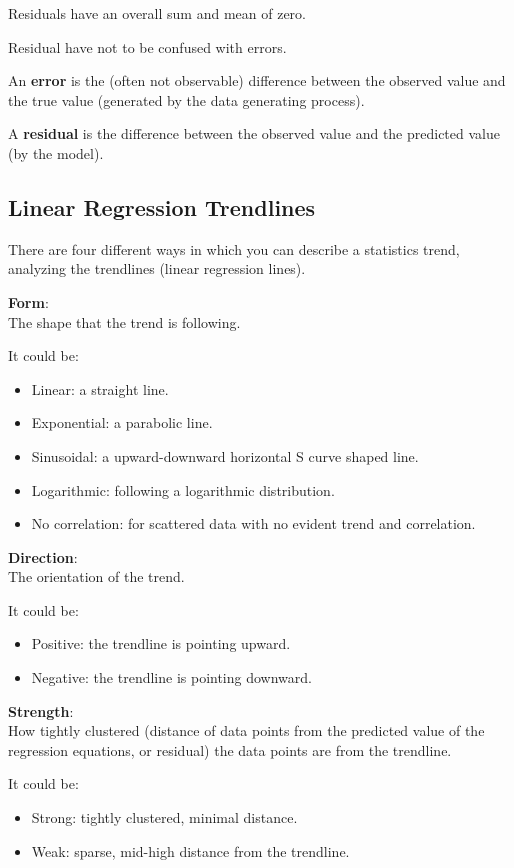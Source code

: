 \documentclass{article}
\begin{document}
Residuals have an overall sum and mean of zero.

Residual have not to be confused with errors.

An \textbf{error} is the (often not observable) difference between the observed value and the true value (generated by the data generating process).

A \textbf{residual} is the difference between the observed value and the predicted value (by the model). 

\subsection{Linear Regression Trendlines}
There are four different ways in which you can describe a statistics trend, analyzing the trendlines (linear regression lines).

\textbf{Form}: \\
The shape that the trend is following. 

It could be: 
\begin{itemize}
    \item Linear: a straight line.
    \item Exponential: a parabolic line.
    \item Sinusoidal: a upward-downward horizontal S curve shaped line.
    \item Logarithmic: following a logarithmic distribution.
    \item No correlation: for scattered data with no evident trend and correlation.
\end{itemize}
 
\textbf{Direction}: \\
The orientation of the trend.

It could be:
\begin{itemize}
    \item Positive: the trendline is pointing upward.
    \item Negative: the trendline is pointing downward.
\end{itemize}

\textbf{Strength}: \\ 
How tightly clustered (distance of data points from the predicted value of the regression equations, or residual) the data points are from the trendline.

It could be:
\begin{itemize}
    \item Strong: tightly clustered, minimal distance.
    \item Weak: sparse, mid-high distance from the trendline. 
\end{itemize}
\end{document}
